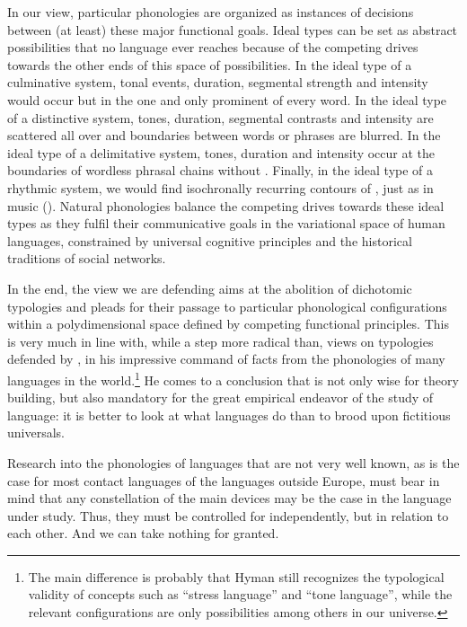 \documentclass[output=paper]{LSP/langsci}
\begin{document}
In our view, particular phonologies are organized as instances of decisions between (at least) these major functional goals. Ideal types can be set as abstract possibilities that no language ever reaches because of the competing drives towards the other ends of this space of  possibilities. In the ideal type of a culminative  system, tonal events, duration, segmental strength and intensity would occur but in the one and only prominent  of every word. In the ideal type of a distinctive  system, tones, duration, segmental contrasts and intensity are scattered all over and boundaries between words or phrases are blurred. In the ideal type of a delimitative  system, tones, duration and intensity occur at the boundaries of wordless phrasal chains without . Finally, in the ideal type of a rhythmic  system, we would find isochronally recurring contours of , just as in music (\citealt{Reich2014}). Natural phonologies balance the competing drives towards these ideal types as they fulfil their communicative goals in the variational space of human languages, constrained by universal cognitive principles and the historical traditions of social networks. 

In the end, the view we are defending aims at the abolition of dichotomic typologies and pleads for their passage to particular phonological configurations within a polydimensional space defined by competing functional principles. This is very much in line with, while a step more radical than, views on  typologies defended by \citet{Hyman2009,Hyman2014}, in his impressive command of facts from the phonologies of many languages in the world.\footnote{The main difference is probably that Hyman still recognizes the typological validity of concepts such as ``stress  language'' and ``tone language'', while the relevant configurations are only possibilities among others in our  universe.} He comes to a conclusion that is not only wise for theory building, but also mandatory for the great empirical endeavor of the study of language: it is better to look at what languages do than to brood upon fictitious universals. 

Research into the  phonologies of languages that are not very well known, as is the case for most contact languages of the  languages outside Europe, must bear in mind that any constellation of the main  devices may be the case in the language under study. Thus, they must be controlled for independently, but in relation to each other. And we can take nothing for granted. 
\end{document}
